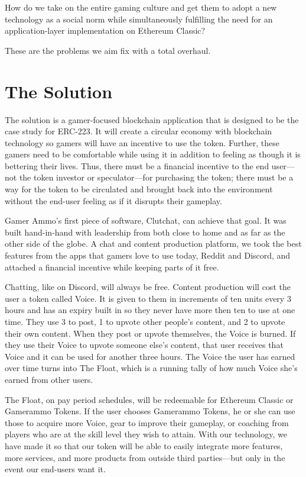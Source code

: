 \documentclass[11pt]{report}
\begin{document}
How do we take on the entire gaming culture and get them to adopt a new technology as a social norm while simultaneously fulfilling the need for an application-layer implementation on Ethereum Classic?

These are the problems we aim fix with a total overhaul.
\section{The Solution}
The solution is a gamer-focused blockchain application that is designed to be the case study for ERC-223. It will create a circular economy with blockchain technology so gamers will have an incentive to use the token. Further, these gamers need to be comfortable while using it in addition to feeling as though it is bettering their lives. Thus, there must be a financial incentive to the end user---not the token investor or speculator---for purchasing the token;  there must be a way for the token to be circulated and brought back into the environment without the end-user feeling as if it disrupts their gameplay.

Gamer Ammo's first piece of software, Clutchat, can achieve that goal. It was built hand-in-hand with leadership from both close to home and as far as the other side of the globe. A chat and content production platform, we took the best features from the apps that gamers love to use today, Reddit and Discord, and attached a financial incentive while keeping parts of it free.

Chatting, like on Discord,\cite{discord} will always be free. Content production will cost the user a token called Voice. It is given to them in increments of ten units every 3 hours and has an expiry built in so they never have more then ten to use at one time. They use 3 to post, 1 to upvote other people's content, and 2 to upvote their own content. When they post or upvote themselves, the Voice is burned. If they use their Voice to upvote someone else's content, that user receives that Voice and it can be used for another three hours. The Voice the user has earned over time turns into The Float, which is a running tally of how much Voice she's earned from other users.

The Float, on pay period schedules, will be redeemable for Ethereum Classic or Gamerammo Tokens. If the user chooses Gamerammo Tokens, he or she can  use those to acquire more Voice, gear to improve their gameplay, or coaching from players who are at the skill level they wish to attain. With our technology, we have made it so that our token will be able to easily integrate more features, more services, and more products from outside third parties---but only in the event our end-users want it.
\end{document}
